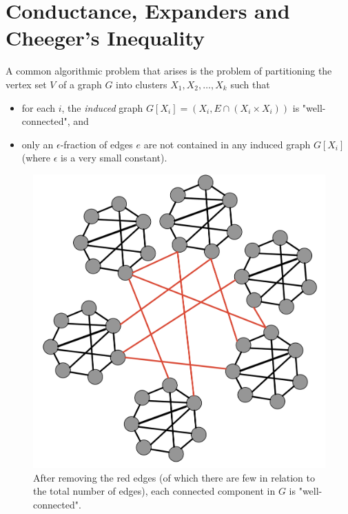 \newcommand\vol{\mathit{vol}}

\chapter{Conductance, Expanders and Cheeger's Inequality}

\sloppy

A common algorithmic problem that arises is the problem of partitioning the vertex set $V$ of a graph $G$ into clusters $X_1, X_2, \dots, X_k$ such that 
\begin{itemize}
    \item for each $i$, the \emph{induced} graph $G[X_i] = (X_i, E \cap (X_i \times X_i))$ is "well-connected", and
    \item only an $\epsilon$-fraction of edges $e$ are not contained in any induced graph $G[X_i]$ (where $\epsilon$ is a very small constant).
\end{itemize}

\begin{figure}[!ht]
    \centering
    \includegraphics[scale=0.25]{fig/fig1_lecCheeger}
    \caption{After removing the red edges (of which there are few in relation to the total number of edges), each connected component in $G$ is "well-connected".}
\end{figure}

